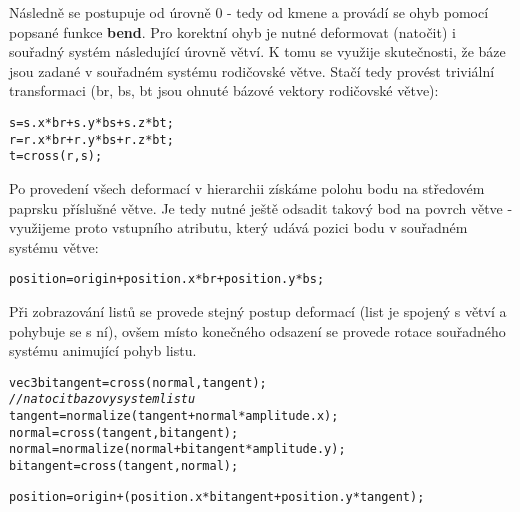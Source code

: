 \pagebreak
Následně se postupuje od úrovně 0 - tedy od kmene a provádí se ohyb pomocí popsané funkce {\bf bend}. Pro korektní ohyb je nutné deformovat (natočit) i souřadný systém následující úrovně větví. K tomu se využije skutečnosti, že báze jsou zadané v souřadném systému rodičovské větve. Stačí tedy provést triviální transformaci (br, bs, bt jsou ohnuté bázové vektory rodičovské větve):
\begin{alltt}
   s = s.x * br + s.y * bs + s.z * bt;
   r = r.x * br + r.y * bs + r.z * bt;
   t = cross( r , s );
\end{alltt}
Po provedení všech deformací v hierarchii získáme polohu bodu na středovém paprsku příslušné větve. Je tedy nutné ještě odsadit takový bod na povrch větve - využijeme proto vstupního atributu, který udává pozici bodu v souřadném systému větve:
 \begin{alltt}
  position = origin + position.x * br + position.y * bs;	
\end{alltt}

Při zobrazování listů se provede stejný postup deformací (list je spojený s větví a pohybuje se s ní), ovšem místo konečného odsazení se provede rotace souřadného systému animující pohyb listu.
 \begin{alltt}
  vec3 bitangent = cross( normal , tangent);
\textit{// natocit bazovy system listu}
  tangent = normalize ( tangent + normal * amplitude.x );
  normal  = cross( tangent , bitangent );
  normal  = normalize ( normal + bitangent * amplitude.y );
  bitangent = cross ( tangent , normal );

  position = origin + ( position.x * bitangent + position.y * tangent );
\end{alltt}